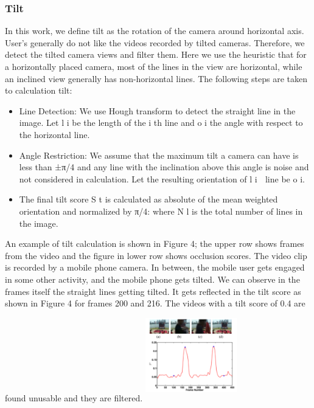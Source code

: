 \documentclass{sig-alternate}
\begin{document}
\subsubsection{Tilt}
In this work, we define tilt as the rotation of the camera around horizontal axis. User’s generally do not like the videos recorded by tilted cameras. Therefore, we detect the tilted camera views and filter them. Here we use the heuristic that for a horizontally placed camera, most of the lines in the view are horizontal, while an inclined view generally has non-horizontal lines. The following steps are taken to calculation tilt:
\begin{itemize}
    \item Line Detection: We use Hough transform to detect the straight line in the image. Let l i  be the length of the i th line and o  i the angle with respect to the horizontal line.
    \item Angle Restriction: We assume that the maximum tilt a camera can have is less than ±π/4 and any line with the inclination above this angle is noise and not considered in calculation. Let the resulting orientation of l i  line be o i.
    \item The final tilt score S t is calculated as absolute of the mean weighted orientation and normalized by π/4:
    where N l is the total number of lines in the image.
\end{itemize}

An example of tilt calculation is shown in Figure 4; the upper row shows frames from the video and the figure in lower row shows occlusion scores. The video clip is recorded by a mobile phone camera. In between, the mobile user gets engaged in some other activity, and the mobile phone gets tilted. We can observe in the frames itself the straight lines getting tilted. It gets reflected in the tilt score as shown in Figure 4 for frames 200 and 216. The videos with a tilt score of 0.4 are found unusable and they are filtered.
\includegraphics[width=4cm, height=4cm]{img3.png}
\end{document}
